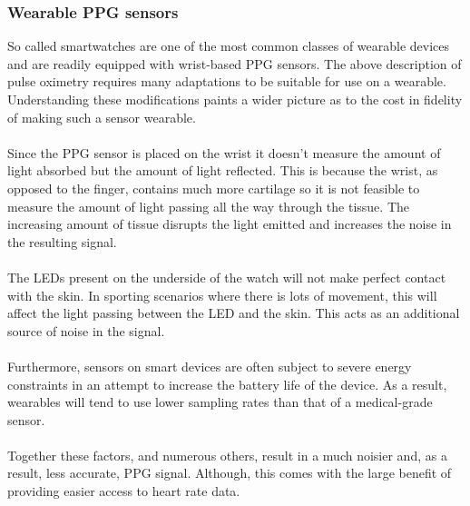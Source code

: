 \subsubsection{Wearable PPG sensors}
So called smartwatches are one of the most common classes of wearable devices and are readily equipped with wrist-based PPG sensors.
The above description of pulse oximetry requires many adaptations to be suitable for use on a wearable. Understanding these modifications paints a wider picture as to 
the cost in fidelity of making such a sensor wearable.
\\\\
Since the PPG sensor is placed on the wrist it doesn't measure the amount of light absorbed but the amount of light reflected. This is because the wrist, as opposed to the finger, contains much more cartilage
so it is not feasible to measure the amount of light passing all the way through the tissue.
The increasing amount of tissue disrupts the light emitted and increases the noise in the resulting signal.
\\\\
The LEDs present on the underside of the watch will not make perfect contact with the skin. In sporting scenarios where there is lots of movement, this will affect the light passing between the LED and the skin. This acts as an additional source of noise in the signal.
\\\\
Furthermore, sensors on smart devices are often subject to severe energy constraints in an attempt to increase the battery life of the device.
As a result, wearables will tend to use lower sampling rates than that of a medical-grade sensor.
\\\\
Together these factors, and numerous others, result in a much noisier and, as a result, less accurate, PPG signal. 
Although, this comes with the large benefit of providing easier access to heart rate data.

